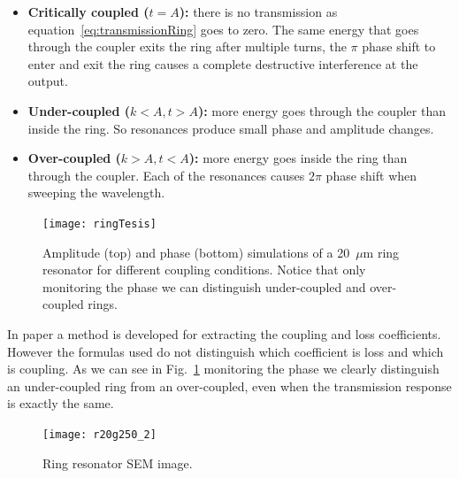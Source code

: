 \documentclass[journal]{IEEEtran}
\begin{document}
\begin{itemize}
 \item \textbf{Critically coupled ($t=A$):}  there is no transmission as equation~\ref{eq:transmissionRing} goes to zero.
 The same energy that goes through the coupler exits the ring after multiple turns, the $\pi$ phase shift to enter and exit the ring causes a complete destructive interference at the output.
 
 \item \textbf{Under-coupled ($k<A,t>A$):}  more energy goes through the coupler than inside the ring. So resonances produce small phase and amplitude changes.		
 
 \item \textbf{Over-coupled ($k>A,t<A$):}  more energy goes inside the ring than through the coupler. Each of the resonances causes $2\pi$ phase shift when sweeping the wavelength.
\end{itemize}



\begin{figure}[htb]
    \centering
    \texttt{[image: ringTesis]}
    \caption{Amplitude (top) and phase (bottom) simulations of a 20~$\mu$m ring resonator for different coupling conditions. Notice that only monitoring the phase we can distinguish under-coupled and over-coupled rings.}
    \label{fig:ringDifferentCoupling}
\end{figure}

In paper \cite{McKinnon2009} a method is developed for extracting the coupling and loss coefficients. However the formulas used do not distinguish which coefficient is loss and which is coupling. As we can see in Fig.~\ref{fig:ringDifferentCoupling} monitoring the phase we clearly distinguish an under-coupled ring from an over-coupled, even when the transmission response is exactly the same. 



\begin{figure}[htb]
    \centering
    \texttt{[image: r20g250\_2]}
    \caption{Ring resonator SEM image.}
    \label{fig:semRingPaperRings}
\end{figure}


\end{document}
